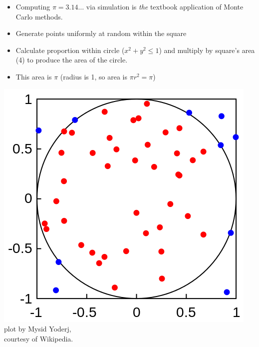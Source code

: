 \documentclass[10pt]{report}
\begin{document}


\noindent
\begin{minipage}[t]{0.65\textwidth}
\begin{itemize}
\item Computing $\pi = 3.14\ldots$ via simulation is \emph{the} textbook application
of Monte Carlo methods.
\vfill
\item Generate points uniformly at random within the square
\item Calculate proportion within circle ($x^2 + y^2 \leq 1$) and multiply by square's area (4) to produce the area of the circle.
\item This area is $\pi$ (radius is 1, so area is $\pi r^2 = \pi$)
\end{itemize}
\end{minipage}
%
\hfill
\begin{minipage}[t]{0.2\textwidth}
\vspace*{12pt}
\hfill \includegraphics[height=\textwidth]{img/mc-integration-wikipedia.png}
\\[4pt]
{\tiny plot by Mysid Yoderj,\\ courtesy of Wikipedia.}
\end{minipage}
\vfill
\end{document}
